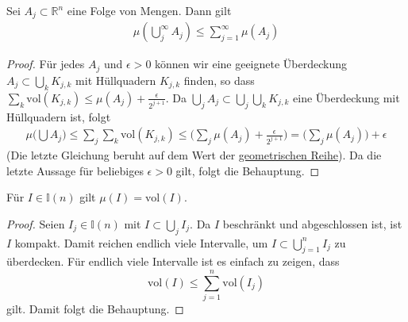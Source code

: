 \begin{Satz}
Sei $A_j \subset \mathbb{R}^n$ eine Folge von Mengen. Dann gilt
\begin{align*}
\mu (\bigcup_j^{\infty} A_j ) \leq \sum_{j=1}^{\infty} \mu(A_j)
\end{align*}
\end{Satz}
\begin{proof}
Für jedes $A_j$ und $\epsilon > 0$ können wir  eine geeignete Überdeckung  $A_j \subset \bigcup_k  K_{j,k}$ mit Hüllquadern $K_{j,k}$ finden, so dass 
 $\sum_k \text{vol} (K_{j,k}) \leq \mu(A_j) + \frac{\epsilon}{2^{j+1}}$.
Da $ \bigcup_j A_j \subset \bigcup_j \bigcup_k  K_{j,k}$ eine Überdeckung mit Hüllquadern ist, folgt
\begin{align*}
\mu \biggl (  \bigcup A_j  \biggr) \leq \sum_j \sum_k \text{vol} (K_{j,k}) \leq  \bigl( \sum_j  \mu(A_j) + \frac{\epsilon}{2^{j+1}} \bigr)  = \bigl (\sum_j \mu(A_j) \bigr ) + \epsilon
\end{align*}
(Die letzte Gleichung beruht auf dem Wert der \href{https://de.wikipedia.org/wiki/Geometrische_Reihe}{geometrischen Reihe}).
Da die letzte Aussage für beliebiges $\epsilon > 0$ gilt, folgt die Behauptung.
\end{proof}


\begin{Bemerkung}
\label{volimu}
Für $I \in \mathbb{I}(n)$ gilt $\mu(I) = \text{vol}(I)$.
\end{Bemerkung}
\begin{proof}
Seien  $I_j \in \mathbb{I}(n)$ mit $I \subset \bigcup_j  I_j$. Da $I$ beschränkt und abgeschlossen ist, ist $I$ kompakt. Damit reichen endlich 
viele Intervalle, um $I  \subset  \bigcup_{j=1}^n  I_j$ zu überdecken. Für endlich viele Intervalle ist es einfach zu zeigen, dass
$$\text{vol} (I) \leq \sum_{j=1}^n \text{vol} (I_j) $$
gilt. Damit folgt die Behauptung.
\end{proof}

